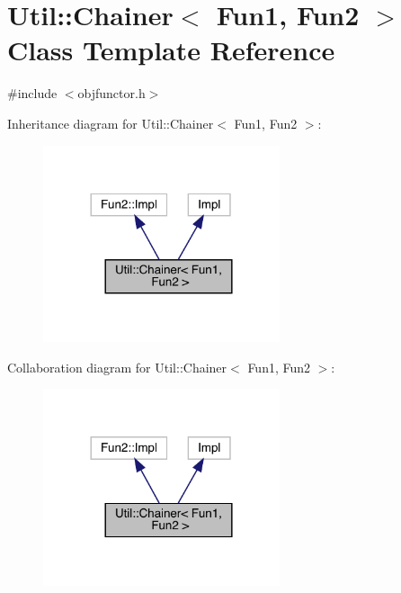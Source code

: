 \hypertarget{classUtil_1_1Chainer}{}\section{Util\+:\+:Chainer$<$ Fun1, Fun2 $>$ Class Template Reference}
\label{classUtil_1_1Chainer}


{\ttfamily \#include $<$objfunctor.\+h$>$}



Inheritance diagram for Util\+:\+:Chainer$<$ Fun1, Fun2 $>$\+:\nopagebreak
\begin{figure}[H]
\begin{center}
\leavevmode
\includegraphics[width=197pt]{d4/da8/classUtil_1_1Chainer__inherit__graph}
\end{center}
\end{figure}


Collaboration diagram for Util\+:\+:Chainer$<$ Fun1, Fun2 $>$\+:\nopagebreak
\begin{figure}[H]
\begin{center}
\leavevmode
\includegraphics[width=197pt]{d4/d10/classUtil_1_1Chainer__coll__graph}
\end{center}
\end{figure}
